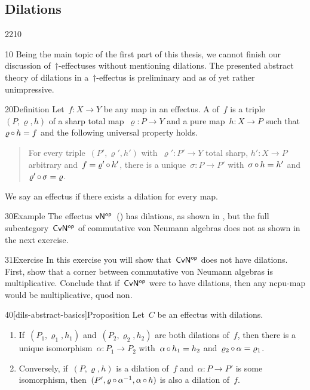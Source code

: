 \subsection{Dilations}
\begin{parsec}{2210}%
\begin{point}{10}%
Being the main topic of the first part of this thesis,
    we cannot finish our discussion of~$\dagger$-effectuses
    without mentioning dilations.
The presented abstract theory of dilations in a~$\dagger$-effectus
    is preliminary and as of yet rather unimpressive.
\end{point}
\begin{point}{20}{Definition}%
Let~$f\colon X \to Y$ be any map in an effectus.
    A  of~$f$ 
    is a triple~$(P, \varrho, h)$
    of a sharp total map~$\varrho \colon P \to Y$
    and a pure map~$h \colon X \to P$
    such that~$\varrho \mathop{\circ} h = f$
        and the following universal property holds.
\begin{quote}
    For every  triple~$(P', \varrho', h')$
    with~$\varrho'\colon P' \to Y$ total sharp,
    $h'\colon X \to P$ arbitrary and~$f = \varrho'\mathop{\circ} h'$,
    there is a unique~$\sigma \colon P \to P'$
    with~$\sigma \mathop{\circ} h = h'$
    and~$\varrho' \mathop{\circ} \sigma = \varrho$.
\end{quote}
    We say an effectus  if 
    there exists a dilation for every map.
\end{point}
\begin{point}{30}{Example}%
    The effectus ${\mathsf{vN}}{^{\mathsf{op}}}$~() has dilations,
    as shown in ,
    but the full subcategory~${\mathsf{CvN}}{^{\mathsf{op}}}$
    of commutative von Neumann algebras
    does not as shown in the next exercise.
\end{point}
\begin{point}{31}{Exercise}%
In this exercise you will show that~${\mathsf{CvN}}{^{\mathsf{op}}}$
    does not have dilations.
First, show that a corner between commutative von Neumann algebras
    is multiplicative.
Conclude that if~${\mathsf{CvN}}{^{\mathsf{op}}}$ were to have dilations,
    then any ncpu-map would be multiplicative, quod non.
\end{point}
\begin{point}{40}[dils-abstract-basics]{Proposition}%
Let~$C$ be an effectus with dilations.
\begin{enumerate}
\item
    If~$(P_1,\varrho_1,h_1)$
    and~$(P_2,\varrho_2,h_2)$
        are both dilations of~$f$,
    then there is a unique isomorphism~$\alpha\colon P_1 \to P_2$
        with~$\alpha \mathop{\circ} h_1 = h_2$ and~$\varrho_2 \mathop{\circ} \alpha = \varrho_1$.
\item
    Conversely,
    if~$(P,\varrho,h)$
        is a dilation of~$f$ and~$\alpha\colon P \to P'$ is some isomorphism,
        then~$(P', \varrho \mathop{\circ} \alpha^{-1}, \alpha \mathop{\circ} h)$
        is also a dilation of~$f$.


\end{enumerate}
\end{point}
\end{parsec}
